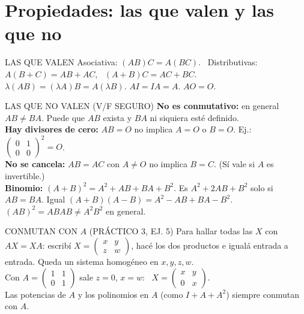 \section{Propiedades: las que valen y las que no}
\begin{sello}{LAS QUE VALEN}
Asociativa: $(AB)C=A(BC)$. \ Distributivas: $A(B+C)=AB+AC$, \ $(A+B)C=AC+BC$.\\
$\lambda(AB)=(\lambda A)B=A(\lambda B)$. \quad $AI=IA=A$. \quad $AO=O$.
\end{sello}
\begin{trampa}{LAS QUE NO VALEN (V/F SEGURO)}
\textbf{No es conmutativo:} en general $AB\neq BA$. Puede que $AB$ exista y $BA$ ni siquiera esté definido.\\[2pt]
\textbf{Hay divisores de cero:} $AB=O$ no implica $A=O$ o $B=O$. Ej.: $\begin{pmatrix}0&1\\0&0\end{pmatrix}^2=O$.\\[2pt]
\textbf{No se cancela:} $AB=AC$ con $A\neq O$ no implica $B=C$. (Sí vale si $A$ es invertible.)\\[2pt]
\textbf{Binomio:} $(A+B)^2=A^2+AB+BA+B^2$. Es $A^2+2AB+B^2$ solo si $AB=BA$. Igual $(A+B)(A-B)=A^2-AB+BA-B^2$.\\[2pt]
$(AB)^2=ABAB\neq A^2B^2$ en general.
\end{trampa}
\begin{memo}{CONMUTAN CON $A$ (PRÁCTICO 3, EJ. 5)}
Para hallar todas las $X$ con $AX=XA$: escribí $X=\begin{pmatrix}x&y\\z&w\end{pmatrix}$, hacé los dos productos e igualá entrada a entrada. Queda un sistema homogéneo en $x,y,z,w$.\\
Con $A=\begin{pmatrix}1&1\\0&1\end{pmatrix}$ sale $z=0$, $x=w$: \ $X=\begin{pmatrix}x&y\\0&x\end{pmatrix}$.\\
Las potencias de $A$ y los polinomios en $A$ (como $I+A+A^2$) siempre conmutan con $A$.
\end{memo}

